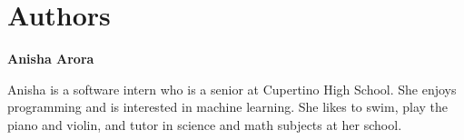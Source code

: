 {{




























\newpage
\section{Authors}

\textbf{Anisha Arora}

Anisha is a software intern who is a senior at Cupertino High School. She enjoys programming and is interested in machine learning. She likes to swim, play the piano and violin, and tutor in science and math subjects at her school.

}}
